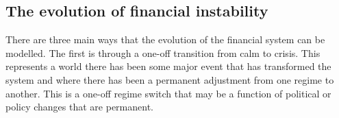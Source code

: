 \documentclass[12pt, a4paper, oneside]{article} %
\begin{document}


\subsection{The evolution of financial instability}
There are three main ways that the evolution of the financial system can be modelled.  The first is through a one-off transition from calm to crisis. This represents a world there has been some major event that has transformed the system and where there has been a permanent adjustment from one regime to another.  This is a one-off regime switch that may be a function of political or policy changes that are permanent.  
\end{document}
